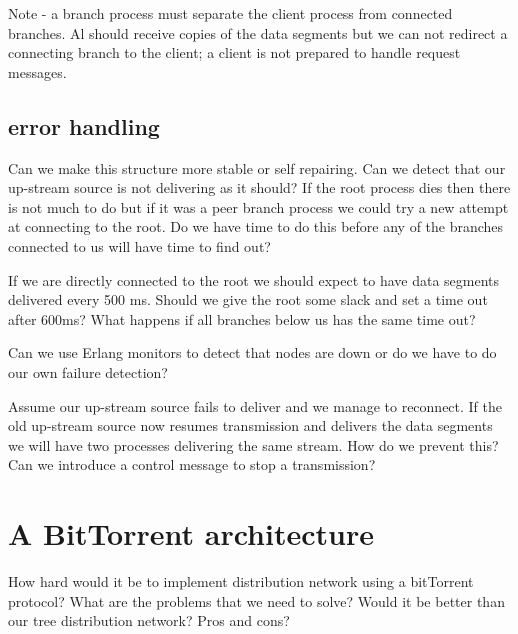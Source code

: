 \documentclass[a4paper,11pt]{article}
\begin{document}
Note - a branch process must separate the client process from connected
branches. Al should receive copies of the data segments but we can not
redirect a connecting branch to the client; a client is not prepared
to handle request messages.

\subsection{error handling}

Can we make this structure more stable or self repairing. Can we detect
that our up-stream source is not delivering as it should? If the root
process dies then there is not much to do but if it was a peer branch
process we could try a new attempt at connecting to the root. Do we
have time to do this before any of the branches connected to us will
have time to find out? 

If we are directly connected to the root we should expect to have
data segments delivered every 500 ms. Should we give the root some
slack and set a time out after 600ms? What happens if all branches
below us has the same time out? 

Can we use Erlang monitors to detect that nodes are down or do we have
to do our own failure detection? 

Assume our up-stream source fails to deliver and we manage to
reconnect. If the old up-stream source now resumes transmission and
delivers the data segments we will have two processes delivering the
same stream. How do we prevent this? Can we introduce a control
message to stop a transmission?

\section{A BitTorrent architecture}

How hard would it be to implement distribution network using a
bitTorrent protocol? What are the problems that we need to solve?
Would it be better than our tree distribution network? Pros and cons?
\end{document}
